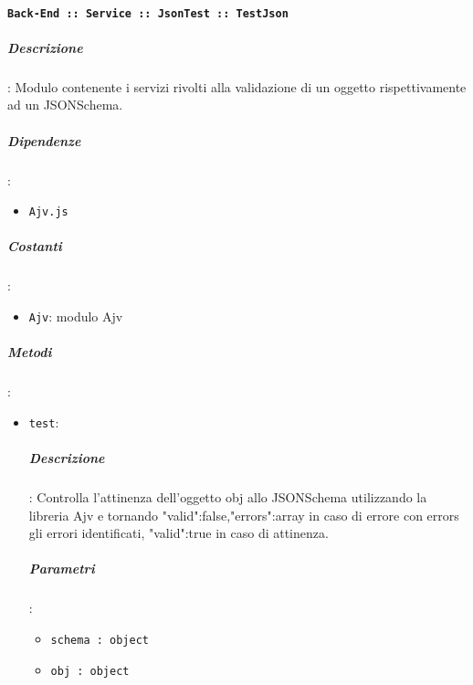 \documentclass[../DefinizioneDiProdotto_v3.0.0.tex]{subfiles}
\begin{document}
\paragraph{\texttt{Back-End :: Service :: JsonTest :: TestJson}}
\subparagraph{Descrizione}: Modulo contenente i servizi rivolti alla validazione di un oggetto rispettivamente ad un JSONSchema.
\subparagraph{Dipendenze}:
\begin{itemize}
	\item \texttt{Ajv.js}
\end{itemize}
\subparagraph{Costanti}:
\begin{itemize}
	\item \texttt{Ajv}: modulo Ajv
\end{itemize}
\subparagraph{Metodi}:\begin{itemize}
\item \texttt{test}:
\subparagraph{Descrizione}: Controlla l'attinenza dell'oggetto obj allo JSONSchema utilizzando la libreria Ajv e tornando {"valid":false,"errors":array} in caso di errore con errors gli errori identificati, {"valid":true} in caso di attinenza.
\subparagraph{Parametri}:
\begin{itemize}
	\item \texttt{schema : object}
	\item \texttt{obj : object}
\end{itemize}
\end{itemize}

\newpage
\end{document}
